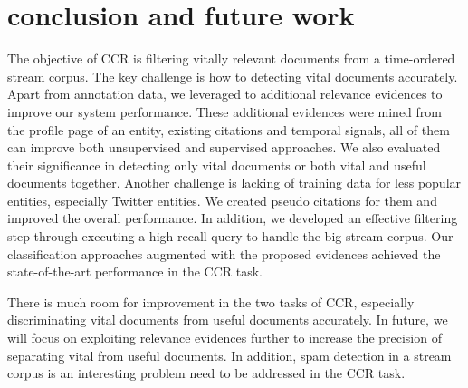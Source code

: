 \documentclass{sig-alternate}
\begin{document}
\section{conclusion and future work}\label{sec:conclusion}
The objective of CCR is filtering vitally relevant documents from a time-ordered stream corpus. The key challenge is how to detecting vital documents accurately. Apart from annotation data, we leveraged to additional relevance evidences to improve our system performance. These additional evidences were mined from the profile page of an entity, existing citations and temporal signals, all of them can improve both unsupervised and supervised approaches. We also evaluated their significance in detecting only vital documents or both vital and useful documents together. Another challenge is lacking of training data for less popular entities, especially Twitter entities. We created pseudo citations for them and improved the overall performance. In addition, we developed an effective filtering step through executing a high recall query to handle the big stream corpus. Our classification approaches augmented with the proposed evidences achieved the state-of-the-art performance in the CCR task. 

There is much room for improvement in the two tasks of CCR, especially discriminating vital documents from useful documents accurately. In future, we will focus on exploiting relevance evidences further to increase the precision of separating vital from useful documents. In addition, spam detection in a stream corpus is an interesting problem need to be addressed in the CCR task.


%

%
%

\end{document}
